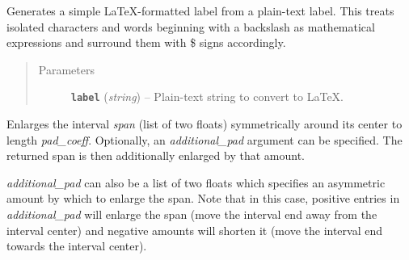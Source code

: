 \documentclass[a4paper,10pt,english]{sphinxmanual}
\begin{document}

\begin{fulllineitems}
\label{index:kafe.plot.label_to_latex}
Generates a simple LaTeX-formatted label from a plain-text label.
This treats isolated characters and words beginning with a backslash
as mathematical expressions and surround them with \$ signs accordingly.
\begin{quote}\begin{description}
\item[{Parameters}] \leavevmode
\textbf{\texttt{label}} (\emph{string}) -- Plain-text string to convert to LaTeX.

\end{description}\end{quote}

\end{fulllineitems}


\begin{fulllineitems}
\label{index:kafe.plot.pad_span}
Enlarges the interval \emph{span} (list of two floats) symmetrically around
its center to length \emph{pad\_coeff}. Optionally, an \emph{additional\_pad} argument
can be specified. The returned span is then additionally enlarged by that
amount.

\emph{additional\_pad} can also be a list of two floats which specifies an
asymmetric amount by which to enlarge the span. Note that in this case,
positive entries in \emph{additional\_pad} will enlarge the span (move the
interval end away from the interval center) and negative amounts will
shorten it (move the interval end towards the interval center).

\end{fulllineitems}


\begin{fulllineitems}
\label{index:kafe.plot.pad_span_log}
\end{fulllineitems}
\end{document}
